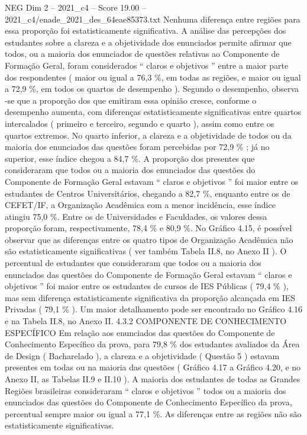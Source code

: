 \begin{textsample}{NEG Dim 2 – 2021\_c4 – Score 19.00 – 2021\_c4/enade\_2021\_des\_64eae85373.txt}
Nenhuma diferença entre regiões para essa proporção foi estatisticamente significativa.
A análise das percepções dos estudantes sobre a clareza e a objetividade dos enunciados permite afirmar que todos, ou a maioria dos enunciados de questões relativas ao Componente de Formação Geral, foram considerados “ claros e objetivos ” entre a maior parte dos respondentes ( maior ou igual a 76,3 \%, em todas as regiões, e maior ou igual a 72,9 \%, em todos os quartos de desempenho ).
Segundo o desempenho, observa -se que a proporção dos que emitiram essa opinião cresce, conforme o desempenho aumenta, com diferenças estatisticamente significativas entre quartos intercalados ( primeiro e terceiro, segundo e quarto ), assim como entre os quartos extremos.
No quarto inferior, a clareza e a objetividade de todos ou da maioria dos enunciados das questões foram percebidas por 72,9 \% ; já no superior, esse índice chegou a 84,7 \%.
A proporção dos presentes que consideraram que todos ou a maioria dos enunciados das questões do Componente de Formação Geral estavam “ claros e objetivos ” foi maior entre os estudantes de Centros Universitários, chegando a 82,7 \%, enquanto entre os de CEFET/IF, a Organização Acadêmica com a menor incidência, esse índice atingiu 75,0 \%.
Entre os de Universidades e Faculdades, os valores dessa proporção foram, respectivamente, 78,4 \% e 80,9 \%.
No Gráfico 4.15, é possível observar que as diferenças entre os quatro tipos de Organização Acadêmica não são estatisticamente significativas ( ver também Tabela II.8, no Anexo II ).
O percentual de estudantes que consideraram que todos ou a maioria dos enunciados das questões do Componente de Formação Geral estavam “ claros e objetivos ” foi maior entre os estudantes de cursos de IES Públicas ( 79,4 \% ), mas sem diferença estatisticamente significativa da proporção alcançada em IES Privadas ( 79,1 \% ).
Um maior detalhamento pode ser encontrado no Gráfico 4.16 e na Tabela II.8, no Anexo II. 4.3.2 COMPONENTE DE CONHECIMENTO ESPECÍFICO Em relação aos enunciados das questões do Componente de Conhecimento Específico da prova, para 79,8 \% dos estudantes avaliados da Área de Design ( Bacharelado ), a clareza e a objetividade ( Questão 5 ) estavam presentes em todas ou na maioria das questões ( Gráfico 4.17 a Gráfico 4.20, e no Anexo II, as Tabelas II.9 e II.10 ).
A maioria dos estudantes de todas as Grandes Regiões brasileiras consideraram “ claros e objetivos ” todos ou a maioria dos enunciados das questões do Componente de Conhecimento Específico da prova, percentual sempre maior ou igual a 77,1 \%.
As diferenças entre as regiões não são estatisticamente significativas.

\end{textsample}
